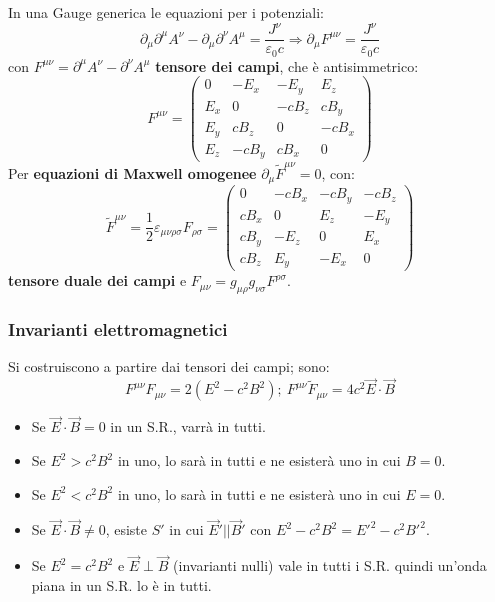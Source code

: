 \documentclass[a4paper]{scrartcl}
\numberwithin{equation}{subsection}
\theoremstyle{style1}
\begin{document}
In una Gauge generica le equazioni per i potenziali:
\begin{equation}
	\partial _\mu \partial ^\mu A^\nu - \partial _\mu \partial ^\nu A^\mu = \frac{J^\nu}{\varepsilon _0 c}\Rightarrow \partial _\mu  F^{\mu \nu} = \frac{J^\nu}{\varepsilon _0 c}  
\end{equation}
con $F^{\mu \nu} = \partial^\mu A^\nu - \partial ^\nu A^\mu$ \textbf{tensore dei campi}, che \`e antisimmetrico:
\begin{equation}
	F^{\mu \nu} =\begin{pmatrix} 0 &-E_x & - E_y &E_z\\ E_x & 0 & -cB_z & cB_y \\ E_y& cB_z & 0 & - cB_x \\ E_z & - cB_y & cB_x & 0 \end{pmatrix} 
\end{equation}
Per \textbf{equazioni di Maxwell omogenee} $\partial _\mu \widetilde{F}^{\mu \nu} = 0 $, con:
\begin{equation}
	\widetilde{F}^{\mu \nu}=\frac{1}{2}\varepsilon _{\mu \nu\rho \sigma  } F_{\rho \sigma  } =\begin{pmatrix} 0&-cB_x & -cB_y& -cB_z\\cB_x & 0  & E_z & -E_y\\cB_y & - E_z & 0 & E_x \\ cB_z & E_y & - E_x & 0 \end{pmatrix}  	
\end{equation}
\textbf{tensore duale dei campi} e $F_{\mu \nu} = g_{\mu \rho   } g_{\nu  \sigma } F^{\rho \sigma } $.
\subsubsection{Invarianti elettromagnetici}
Si costruiscono a partire dai tensori dei campi; sono:
\begin{equation}
	F^{\mu  \nu} F_{\mu \nu} = 2(E^2- c^2 B^2); \ F^{\mu \nu} \widetilde{F}_{\mu \nu} = 4c^2 \vec{E}\cdot \vec{B} 
\end{equation}
\begin{itemize}
	\item Se $\vec{E}\cdot \vec{B}= 0 $ in un S.R., varr\`a in tutti.
	\item Se $E^2>c^2B^2$ in uno, lo sar\`a in tutti e ne esister\`a uno in cui $B=0$.
	\item Se $E^2 < c^2 B^2$ in uno, lo sar\`a in tutti e ne esister\`a uno in cui $E=0$.
	\item Se $\vec{E}\cdot \vec{B}\neq 0$, esiste $S'$ in cui $\vec{E}'  | |  \vec{B}'$ con $E^2 - c^2 B^2 = E'^2 - c^2 B'^2$.
	\item Se $E^2 = c^2 B^2$ e $\vec{E}\perp \vec{B}$ (invarianti nulli) vale in tutti i S.R. quindi un'onda piana in un S.R. lo \`e in tutti.
\end{itemize}
\end{document}
